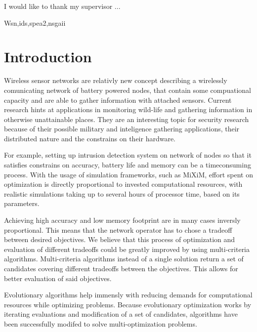 \documentclass[12pt,oneside]{fithesis2}
\begin{document}
\FrontMatter
\ThesisTitlePage
\begin{ThesisDeclaration}
\DeclarationText
\AdvisorName
\end{ThesisDeclaration}
\begin{ThesisThanks}
I would like to thank my supervisor ...
\end{ThesisThanks}
\begin{ThesisAbstract}
\end{ThesisAbstract}
 
\begin{ThesisKeyWords}
Wsn,ids,spea2,nsgaii
\end{ThesisKeyWords}

\tableofcontents %

\MainMatter
\chapter{Introduction}
Wireless sensor networks are relativly new concept describing a wirelessly comunicating network of battery powered nodes, that contain some compuational capacity and are able to gather information with attached sensors. Current research hints at applications in monitoring wild-life and gathering information in otherwise unattainable places. They are an interesting topic for security research because of their possible military and inteligence gathering applications, their distributed nature and the constrains on their hardware. 

For example, setting up intrusion detection system on network of nodes so that it satisfies constrains on accuracy, battery life and memory can be a timeconsuming process. With the usage of simulation frameworks, such as MiXiM, effort spent on optimization is directly proportional to invested computational resources, with realistic simulations taking up to several hours of processor time, based on its parameters.

Achieving high accuracy and low memory footprint are in many cases inversly proportional. This means that the network operator has to chose a tradeoff between desired objectives.  We believe that this process of optimization and evaluation of different tradeoffs could be greatly improved by using multi-criteria algorithms. Multi-criteria algorithms instead of a single solution return a set of candidates covering different tradeoffs between the objectives. This allows for better evaluation of said objectives.

Evolutionary algorithms help immensly with reducing demands for computational resources while optimizing problems. Because evolutionary optimization works by iterating evaluations and modification of a set of candidates, algorithms have been successfully modifed to solve multi-optimization problems.
\end{document}
